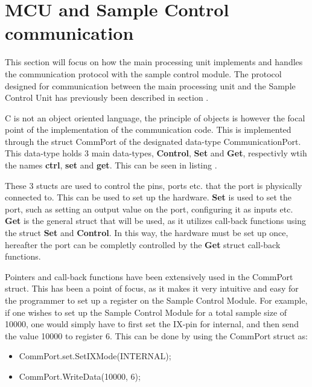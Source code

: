 \section{MCU and Sample Control communication} \label{subsec:MCUSCCommunication} 
This section will focus on how the main processing unit implements and handles the communication protocol with the sample control module. 
The protocol designed for communication between the main processing unit and the Sample Control Unit has previously been described in section .

C is not an object oriented language, the principle of objects is however the focal point of the implementation of the communication code. This is implemented through the struct CommPort of the designated data-type CommunicationPort. This data-type holds 3 main data-types, \textbf{Control}, \textbf{Set} and \textbf{Get}, respectivly wtih the names \textbf{ctrl}, \textbf{set} and \textbf{get}. This can be seen in listing .



These 3 stucts are used to control the pins, ports etc. that the port is physically connected to. This can be used to set up the hardware. \textbf{Set} is used to set the port, such as setting an output value on the port, configuring it as inputs etc. \textbf{Get} is the general struct that will be used, as it utilizes call-back functions using the struct \textbf{Set} and \textbf{Control}. In this way, the hardware must be set up once, hereafter the port can be completly controlled by the \textbf{Get} struct call-back functions. 

Pointers and call-back functions have been extensively used in the CommPort struct. This has been a point of focus, as it makes it very intuitive and easy for the programmer to set up a register on the Sample Control Module. For example, if one wishes to set up the Sample Control Module for a total sample size of 10000, one would simply have to first set the IX-pin for internal, and then send the value 10000 to register 6. This can be done by using the CommPort struct as:

\begin{itemize}
    \item CommPort.set.SetIXMode(INTERNAL);
    \item CommPort.WriteData(10000, 6);
\end{itemize}

